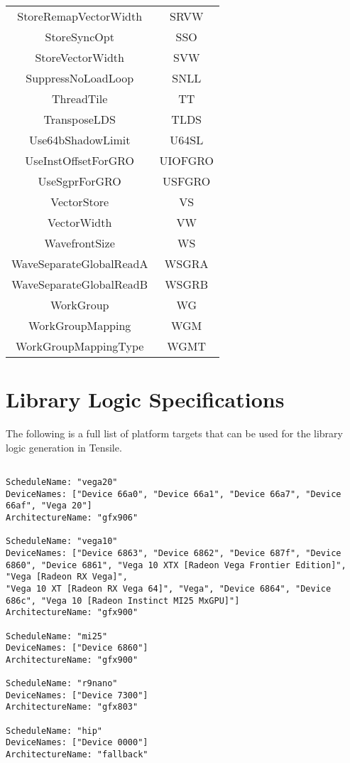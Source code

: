 \documentclass[]{article}
\begin{document}
\begin{center}
\begin{small}
\begin{longtable}{ |c|c| }
 StoreRemapVectorWidth & SRVW \\
 StoreSyncOpt & SSO \\
 StoreVectorWidth & SVW \\
 SuppressNoLoadLoop & SNLL \\
 ThreadTile & TT \\
 TransposeLDS & TLDS \\
 Use64bShadowLimit & U64SL \\
 UseInstOffsetForGRO & UIOFGRO \\
 UseSgprForGRO & USFGRO \\
 VectorStore & VS \\
 VectorWidth & VW \\
 WavefrontSize & WS \\
 WaveSeparateGlobalReadA & WSGRA \\
 WaveSeparateGlobalReadB & WSGRB \\
 WorkGroup & WG \\
 WorkGroupMapping & WGM \\
 WorkGroupMappingType & WGMT \\
 \hline
\end{longtable}
\end{small}
\end{center}

\section{Library Logic Specifications}
\label{sec:appendixD}

The following is a full list of platform targets that can be used for the library logic generation in Tensile.


\begin{verbatim}

ScheduleName: "vega20"
DeviceNames: ["Device 66a0", "Device 66a1", "Device 66a7", "Device 66af", "Vega 20"]
ArchitectureName: "gfx906"

ScheduleName: "vega10"
DeviceNames: ["Device 6863", "Device 6862", "Device 687f", "Device 6860", "Device 6861", "Vega 10 XTX [Radeon Vega Frontier Edition]", "Vega [Radeon RX Vega]",
"Vega 10 XT [Radeon RX Vega 64]", "Vega", "Device 6864", "Device 686c", "Vega 10 [Radeon Instinct MI25 MxGPU]"]
ArchitectureName: "gfx900"

ScheduleName: "mi25"
DeviceNames: ["Device 6860"]
ArchitectureName: "gfx900"

ScheduleName: "r9nano"
DeviceNames: ["Device 7300"]
ArchitectureName: "gfx803"

ScheduleName: "hip"
DeviceNames: ["Device 0000"]
ArchitectureName: "fallback"

\end{verbatim}
\end{document}
